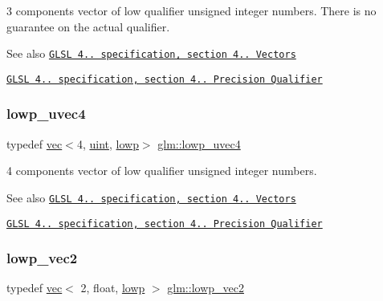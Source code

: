 3 components vector of low qualifier unsigned integer numbers. There is no guarantee on the actual qualifier.

\begin{DoxySeeAlso}{See also}
\href{http://www.opengl.org/registry/doc/GLSLangSpec.4.20.8.pdf}{\tt G\+L\+SL 4.. specification, section 4.. Vectors} 

\href{http://www.opengl.org/registry/doc/GLSLangSpec.4.20.8.pdf}{\tt G\+L\+SL 4.. specification, section 4.. Precision Qualifier} 
\end{DoxySeeAlso}
\mbox{\label{group__core__precision_ga0ecd5668a8e001e14a9dab2cffd09285}} 
\subsubsection{\texorpdfstring{lowp\+\_\+uvec4}{lowp\_uvec4}}
{\footnotesize\ttfamily typedef \mbox{\hyperlink{structglm_1_1vec}{vec}}$<$4, \mbox{\hyperlink{group__core__precision_ga4fd29415871152bfb5abd588334147c8}{uint}}, \mbox{\hyperlink{namespaceglm_a36ed105b07c7746804d7fdc7cc90ff25ae161af3fc695e696ce3bf69f7332bc2d}{lowp}}$>$ \mbox{\hyperlink{group__core__precision_ga0ecd5668a8e001e14a9dab2cffd09285}{glm\+::lowp\+\_\+uvec4}}}

4 components vector of low qualifier unsigned integer numbers.

\begin{DoxySeeAlso}{See also}
\href{http://www.opengl.org/registry/doc/GLSLangSpec.4.20.8.pdf}{\tt G\+L\+SL 4.. specification, section 4.. Vectors} 

\href{http://www.opengl.org/registry/doc/GLSLangSpec.4.20.8.pdf}{\tt G\+L\+SL 4.. specification, section 4.. Precision Qualifier} 
\end{DoxySeeAlso}
\mbox{\label{group__core__precision_gaade87cebca8e38717e38c18df8fc9c8a}} 
\subsubsection{\texorpdfstring{lowp\+\_\+vec2}{lowp\_vec2}}
{\footnotesize\ttfamily typedef \mbox{\hyperlink{structglm_1_1vec}{vec}}$<$ 2, float, \mbox{\hyperlink{namespaceglm_a36ed105b07c7746804d7fdc7cc90ff25ae161af3fc695e696ce3bf69f7332bc2d}{lowp}} $>$ \mbox{\hyperlink{group__core__precision_gaade87cebca8e38717e38c18df8fc9c8a}{glm\+::lowp\+\_\+vec2}}}

